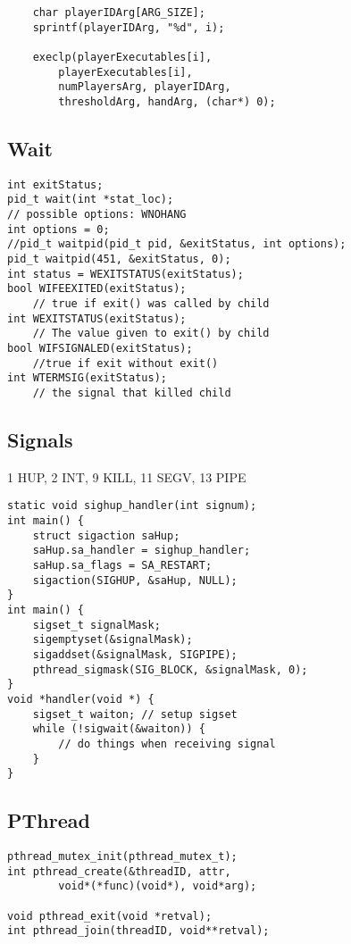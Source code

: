 \documentclass[10pt, a4paper, leqno]{article}
\begin{document}
\begin{multicols}{2}
\begin{verbatim}
    char playerIDArg[ARG_SIZE];
    sprintf(playerIDArg, "%d", i);

    execlp(playerExecutables[i], 
        playerExecutables[i],
        numPlayersArg, playerIDArg,
        thresholdArg, handArg, (char*) 0);
\end{verbatim}

    \subsection {Wait}

    \begin{verbatim}
int exitStatus;
pid_t wait(int *stat_loc);
// possible options: WNOHANG
int options = 0;
//pid_t waitpid(pid_t pid, &exitStatus, int options);
pid_t waitpid(451, &exitStatus, 0);
int status = WEXITSTATUS(exitStatus);
bool WIFEEXITED(exitStatus); 
    // true if exit() was called by child
int WEXITSTATUS(exitStatus);
    // The value given to exit() by child
bool WIFSIGNALED(exitStatus); 
    //true if exit without exit() 
int WTERMSIG(exitStatus); 
    // the signal that killed child
\end{verbatim}

\subsection {Signals}

1 HUP, 2 INT, 9 KILL, 11 SEGV, 13 PIPE

\begin{verbatim}
static void sighup_handler(int signum);
int main() {
    struct sigaction saHup;
    saHup.sa_handler = sighup_handler;
    saHup.sa_flags = SA_RESTART;
    sigaction(SIGHUP, &saHup, NULL);
}
int main() {
    sigset_t signalMask;
    sigemptyset(&signalMask);
    sigaddset(&signalMask, SIGPIPE);
    pthread_sigmask(SIG_BLOCK, &signalMask, 0);
}
void *handler(void *) {
    sigset_t waiton; // setup sigset
    while (!sigwait(&waiton)) {
        // do things when receiving signal
    }
}
\end{verbatim}

\subsection {PThread}

\begin{verbatim}
pthread_mutex_init(pthread_mutex_t);
int pthread_create(&threadID, attr, 
        void*(*func)(void*), void*arg);

void pthread_exit(void *retval);
int pthread_join(threadID, void**retval);


\end{verbatim}
\end{multicols}
\end{document}
